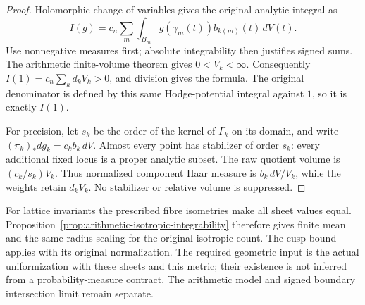 \begin{proof}
Holomorphic change of variables gives the original analytic
integral as
\[
 I(g)=c_n\sum_m\int_{B_m}g(\gamma_m(t))b_{k(m)}(t)\,dV(t).
\]
Use nonnegative measures first; absolute integrability then
justifies signed sums. The arithmetic finite-volume theorem gives
$0<V_k<\infty$. Consequently
$I(1)=c_n\sum_k d_kV_k>0$, and division gives the formula.
The original denominator is defined by this same Hodge-potential
integral against $1$, so it is exactly $I(1)$.

For precision, let $s_k$ be the order of the kernel of
$\Gamma_k$ on its domain, and write
$(\pi_k)_*dg_k=c_kb_k\,dV$. Almost every point has stabilizer
of order $s_k$: every additional fixed locus is a proper analytic
subset. The raw quotient volume is
$(c_k/s_k)V_k$. Thus normalized component Haar measure is
$b_k\,dV/V_k$, while the weights retain $d_kV_k$.
No stabilizer or relative volume is suppressed.
\end{proof}

For lattice invariants the prescribed fibre isometries make all
sheet values equal. Proposition~\ref{prop:arithmetic-isotropic-integrability}
therefore gives finite mean and the same radius scaling for the
original isotropic count. The cusp bound applies with its original
normalization. The required geometric input is the actual
uniformization with these sheets and this metric; their existence
is not inferred from a probability-measure contract. The arithmetic
model and signed boundary intersection limit remain separate.

